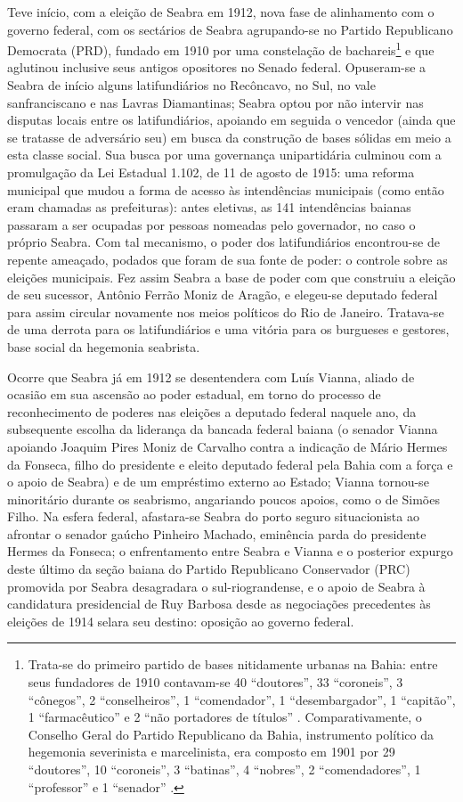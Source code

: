 Teve início, com a eleição de Seabra em 1912, nova fase de alinhamento com o governo federal, com os sectários de Seabra agrupando-se no Partido Republicano Democrata (PRD), fundado em 1910 por uma constelação de bachareis\footnote{Trata-se do primeiro partido de bases nitidamente urbanas na Bahia: entre seus fundadores de 1910 contavam-se 40 ``doutores'', 33 ``coroneis'', 3 ``cônegos'', 2 ``conselheiros'', 1 ``comendador'', 1 ``desembargador'', 1 ``capitão'', 1 ``farmacêutico'' e 2 ``não portadores de títulos'' \cite[p.~70]{sampaio_partidos_1978}. Comparativamente, o Conselho Geral do Partido Republicano da Bahia, instrumento político da hegemonia severinista e marcelinista, era composto em 1901 por 29 ``doutores'', 10 ``coroneis'', 3 ``batinas'',  4 ``nobres'', 2 ``comendadores'', 1 ``professor'' e 1 ``senador'' \cite[p.~49]{sampaio_partidos_1978}.} e que aglutinou inclusive seus antigos opositores no Senado federal. Opuseram-se a Seabra de início alguns latifundiários no Recôncavo, no Sul, no vale sanfranciscano e nas Lavras Diamantinas; Seabra optou por não intervir nas disputas locais entre os latifundiários, apoiando em seguida o vencedor (ainda que se tratasse de adversário seu) em busca da construção de bases sólidas em meio a esta classe social. Sua busca por uma governança unipartidária culminou com a promulgação da Lei Estadual 1.102, de 11 de agosto de 1915: uma reforma municipal que mudou a forma de acesso às intendências municipais (como então eram chamadas as prefeituras): antes eletivas, as 141 intendências baianas passaram a ser ocupadas por pessoas nomeadas pelo governador, no caso o próprio Seabra. Com tal mecanismo, o poder dos latifundiários encontrou-se de repente ameaçado, podados que foram de sua fonte de poder: o controle sobre as eleições municipais. Fez assim Seabra a base de poder com que construiu a eleição de seu sucessor, Antônio Ferrão Moniz de Aragão, e elegeu-se deputado federal para assim circular novamente nos meios políticos do Rio de Janeiro. Tratava-se de uma derrota para os latifundiários e uma vitória para os burgueses e gestores, base social da hegemonia seabrista.

Ocorre que Seabra já em 1912 se desentendera com Luís Vianna, aliado de ocasião em sua ascensão ao poder estadual, em torno do processo de reconhecimento de poderes nas eleições a deputado federal naquele ano, da subsequente escolha da liderança da bancada federal baiana (o senador Vianna apoiando Joaquim Pires Moniz de Carvalho contra a indicação de Mário Hermes da Fonseca, filho do presidente e eleito deputado federal pela Bahia com a força e o apoio de Seabra) e de um empréstimo externo ao Estado; Vianna tornou-se minoritário durante os seabrismo, angariando poucos apoios, como o de Simões Filho. Na esfera federal, afastara-se Seabra do porto seguro situacionista ao afrontar o senador gaúcho Pinheiro Machado, eminência parda do presidente Hermes da Fonseca; o enfrentamento entre Seabra e Vianna e o posterior expurgo deste último da seção baiana do Partido Republicano Conservador (PRC) promovida por Seabra desagradara o sul-riograndense, e o apoio de Seabra à candidatura presidencial de Ruy Barbosa desde as negociações precedentes às eleições de 1914 selara seu destino: oposição ao governo federal.

